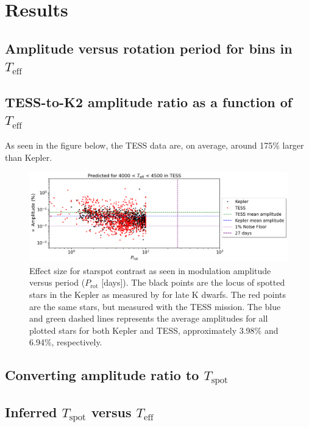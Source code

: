 \documentclass[twocolumn]{aastex631}
\begin{document}
\section{Results}

\subsection{Amplitude versus rotation period for bins in $T_{\mathrm{eff}}$}

\subsection{TESS-to-K2 amplitude ratio as a function of $T_{\mathrm{eff}}$}

As seen in the figure below, the TESS data are, on average, around 175\% larger than Kepler.

\begin{figure}[!htb]
  \centering
  \includegraphics[width=0.95\columnwidth]{Amplitude vs. Rotation for Kepler and TESS.png}
  \caption{Effect size for starspot contrast as seen in modulation amplitude versus period ($P_{\mathrm{rot}}$ [days]). The black points are the locus of spotted stars in the Kepler as measured by for late K dwarfs. The red points are the same stars, but measured with the TESS mission. The blue and green dashed lines represents the average amplitudes for all plotted stars for both Kepler and TESS, approximately 3.98\% and 6.94\%, respectively.}
\end{figure}
\FloatBarrier

\subsection{Converting amplitude ratio to $T_{\mathrm{spot}}$}

\subsection{Inferred $T_{\mathrm{spot}}$ versus $T_{\mathrm{eff}}$}
\end{document}
